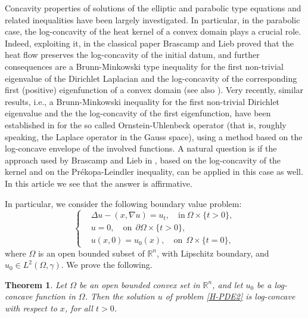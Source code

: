\documentclass[12pt]{amsart}
\newtheorem{theorem}{Theorem}[section]
\newcommand{\R}{\mathbb R}
\newcommand{\1}{\mathbf 1}
\begin{document}
Concavity properties of solutions of the elliptic and parabolic type equations and related inequalities have been largely investigated.
In particular, in the parabolic case, the log-concavity of the heat kernel of a convex domain plays a crucial role.
Indeed, exploiting it, in the classical paper \cite{BL76} Brascamp and Lieb proved that the heat flow preserves the log-concavity of the initial datum, and further consequences are a Brunn-Minkowski type inequality for the first non-trivial eigenvalue of the Dirichlet Laplacian and the log-concavity of the corresponding first (positive) eigenfunction of a convex domain (see also \cite{DD1979}).
Very recently, similar results, i.e., a Brunn-Minkowski inequality for the first non-trivial Dirichlet eigenvalue and the the log-concavity of the first eigenfunction, have been established in \cite{CFLS24} for the so called Ornstein-Uhlenbeck operator (that is, roughly speaking, the Laplace operator in the Gauss space), using a method based on the log-concave envelope of the involved functions. A natural question is if the approach used by Brascamp and Lieb in \cite{BL76}, based on the log-concavity of the kernel and on the Pr\'ekopa-Leindler inequality, can be applied in this case as well. In this article we see that the answer is affirmative.

In particular, we consider the following boundary value problem:
\begin{equation}\label{H-PDE2}
\left\{
\begin{aligned}
&\Delta u -(x,\nabla u)=u_t, \quad\mbox{in} \ \Omega \times \{t>0\},  \\
&u=0,  \quad\mbox{on} \ \ \partial\Omega\times \{ t>0 \}, \\
&u(x,0)=u_0(x),\quad\mbox{on} \ \ \Omega \times \{ t=0 \},
\end{aligned}
\right.
\end{equation}
where $\Omega$ is an open bounded subset of $\R^n$, with Lipschitz boundary, and  $u_0\in L^2(\Omega,\gamma)$.
We prove the following.

\begin{theorem}\label{T1}
Let $\Omega$ be an open bounded convex set in $\R^n$, and let $u_0$ be a log-concave function in $\Omega$. Then the solution $u$ of problem \eqref{H-PDE2} is log-concave with respect to $x$, for all $t>0$.
\end{theorem}
\end{document}
